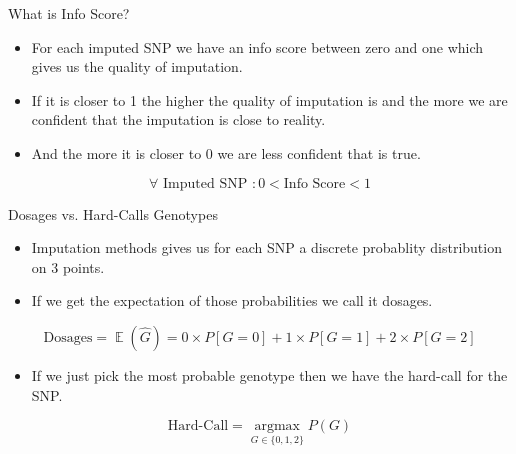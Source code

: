 \documentclass{beamer}
\DeclareMathOperator{\E}{\mathbb{E}}
\begin{document}
\begin{frame}{What is Info Score?}

      \begin{itemize}
            \item For each imputed SNP we have an info score between zero and one which gives us the quality of imputation.
            \item If it is closer to 1 the higher the quality of imputation is and the more we are confident that the imputation is close to reality. 
            \item And the more it is closer to 0 we are less confident that is true.
      \end{itemize}

      \[ \forall \text{ Imputed SNP } : 0 < \text{Info Score} < 1\]

\end{frame}



\begin{frame}{Dosages vs. Hard-Calls Genotypes}

      \begin{itemize}
            \item Imputation methods gives us for each SNP a discrete probablity distribution on 3 points.
            \item If we get the expectation of those probabilities we call it dosages. %
      \end{itemize}

      \[
           \text{Dosages} = \E(\hat{G}) = 0\times P[G=0] + 1\times P[G=1] + 2 \times P[G=2]  
      \]

      \begin{itemize}
            \item If we just pick the most probable genotype then we have the hard-call for the SNP.
      \end{itemize}

      \[
            \text{Hard-Call} = \operatorname*{argmax}_{G \in \{0,1,2\}} P(G)
      \]

\end{frame}
\end{document}
